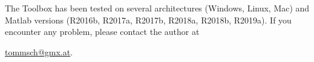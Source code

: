 The Toolbox has been tested on several architectures (Windows, Linux, Mac) 
and Matlab versions (R2016b, R2017a, R2017b, R2018a, R2018b, R2019a).
If you encounter any problem, please contact the author at 
\begin{center}
\href{mailto:tommsch@gmx.at}{tommsch@gmx.at}.
\end{center}


